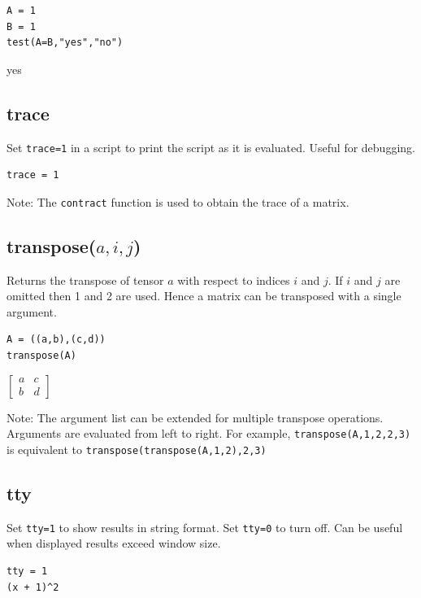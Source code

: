 \documentclass[12pt]{article}
\begin{document}
{\color{blue}
\begin{verbatim}
A = 1
B = 1
test(A=B,"yes","no")
\end{verbatim}
}

\noindent
yes

\subsection*{trace}

Set {\tt trace=1} in a script to print the script as it is evaluated.
Useful for debugging.

{\color{blue}
\begin{verbatim}
trace = 1
\end{verbatim}
}

\noindent
Note:
The
\verb$contract$
function is used to obtain the trace of a matrix.

\subsection*{transpose($a,i,j$)}

Returns the transpose of tensor $a$ with respect to indices $i$ and $j$.
If $i$ and $j$ are omitted then 1 and 2 are used.
Hence a matrix can be transposed with a single argument.

{\color{blue}
\begin{verbatim}
A = ((a,b),(c,d))
transpose(A)
\end{verbatim}
}

\noindent
$\displaystyle
\begin{bmatrix}
a & c
\\[1ex]
b & d
\end{bmatrix}
$

\bigskip
\noindent
Note:
The argument list can be extended for multiple transpose operations.
Arguments are evaluated from left to right.
For example,
\verb$transpose(A,1,2,2,3)$
is equivalent to
\verb$transpose(transpose(A,1,2),2,3)$

\subsection*{tty}

Set \verb$tty=1$ to show results in string format.
Set \verb$tty=0$ to turn off.
Can be useful when displayed results exceed window size.

{\color{blue}
\begin{verbatim}
tty = 1
(x + 1)^2
\end{verbatim}
}
\end{document}
